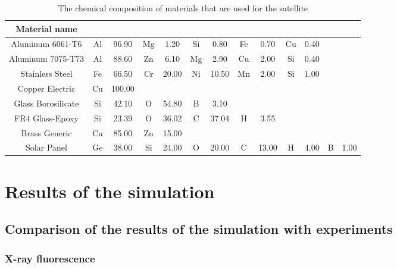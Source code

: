 \documentclass[12pt, a4paper,titlepage]{article}
\numberwithin{equation}{section}
\numberwithin{figure}{section}
\begin{document}
\begin{table}

\begin{center}
\begin{tabular}{ |c|c|c|c|c|c|c|c|c|c|c|c|c|} 
 \hline
Material name & &&&&&&&&&&& \\\hline

Aluminum 6061-T6 &	Al & 96.90 &	Mg &	1.20 &	Si &	0.80 &	Fe &	0.70 &	Cu &	0.40 & &\\\hline		
Aluminum 7075-T73 &	Al &	88.60 &	Zn &	6.10 &	Mg &	2.90 &	Cu &	2.00 &	Si &	0.40 & &\\\hline		
Stainless Steel &	Fe &	66.50 &	Cr &	20.00 &	Ni &	10.50	&Mn &	2.00 &	Si &	1.00 & &\\\hline		
Copper Electric  &Cu &	100.00 & & & & & & & & & &	\\\hline					
Glass Borosilicate &	Si &	42.10 &	O &	54.80 &	B &	3.10 & & & & & &\\\hline			
FR4 Glass-Epoxy &	Si &	23.39 &	O &	36.02 &	C &	37.04 &	H &	3.55 & & & &\\\hline		
Brass Generic &	Cu &	85.00 &	Zn &	15.00 & & & & & & & &\\\hline						
Solar Panel &	Ge &	38.00 &	Si &	24.00 &	O &	20.00 &	C &	13.00 &	H &	4.00 &	B &	1.00\\\hline
\end{tabular}
\end{center}
\caption{The chemical composition of materials that are used for the satellite}
\end{table}

\pagebreak

\section{Results of the simulation}


\subsection{Comparison of the results of the simulation with experiments}

\subsubsection{X-ray fluorescence}
\end{document}
